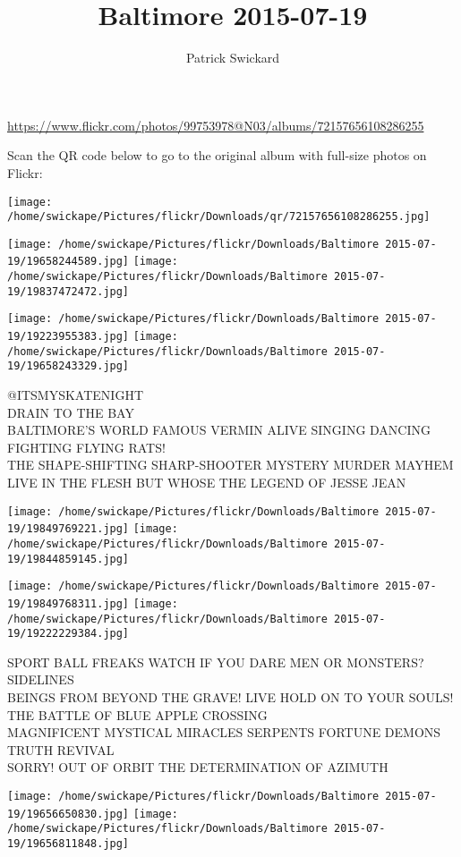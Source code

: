 \documentclass[10pt,letterpaper]{article}
\title{Baltimore 2015-07-19}
\author{Patrick Swickard}
\date{}
\begin{document}
\maketitle

\url{https://www.flickr.com/photos/99753978@N03/albums/72157656108286255}

Scan the QR code below to go to the original album with full-size photos on Flickr:

\texttt{[image: /home/swickape/Pictures/flickr/Downloads/qr/72157656108286255.jpg]}
\pagebreak

\texttt{[image: /home/swickape/Pictures/flickr/Downloads/Baltimore 2015-07-19/19658244589.jpg]}
\texttt{[image: /home/swickape/Pictures/flickr/Downloads/Baltimore 2015-07-19/19837472472.jpg]}

\texttt{[image: /home/swickape/Pictures/flickr/Downloads/Baltimore 2015-07-19/19223955383.jpg]}
\texttt{[image: /home/swickape/Pictures/flickr/Downloads/Baltimore 2015-07-19/19658243329.jpg]}

@ITSMYSKATENIGHT\\
DRAIN TO THE BAY\\
BALTIMORE'S WORLD FAMOUS VERMIN ALIVE SINGING DANCING FIGHTING FLYING RATS!\\
THE SHAPE{-}SHIFTING SHARP{-}SHOOTER MYSTERY MURDER MAYHEM LIVE IN THE FLESH BUT WHOSE THE LEGEND OF JESSE JEAN
\pagebreak

\texttt{[image: /home/swickape/Pictures/flickr/Downloads/Baltimore 2015-07-19/19849769221.jpg]}
\texttt{[image: /home/swickape/Pictures/flickr/Downloads/Baltimore 2015-07-19/19844859145.jpg]}

\texttt{[image: /home/swickape/Pictures/flickr/Downloads/Baltimore 2015-07-19/19849768311.jpg]}
\texttt{[image: /home/swickape/Pictures/flickr/Downloads/Baltimore 2015-07-19/19222229384.jpg]}

SPORT BALL FREAKS WATCH IF YOU DARE MEN OR MONSTERS?  SIDELINES\\
BEINGS FROM BEYOND THE GRAVE!   LIVE HOLD ON TO YOUR SOULS!  THE BATTLE OF BLUE APPLE CROSSING\\
MAGNIFICENT MYSTICAL MIRACLES SERPENTS FORTUNE DEMONS TRUTH REVIVAL\\
SORRY!  OUT OF ORBIT THE DETERMINATION OF AZIMUTH
\pagebreak

\texttt{[image: /home/swickape/Pictures/flickr/Downloads/Baltimore 2015-07-19/19656650830.jpg]}
\texttt{[image: /home/swickape/Pictures/flickr/Downloads/Baltimore 2015-07-19/19656811848.jpg]}
\end{document}
